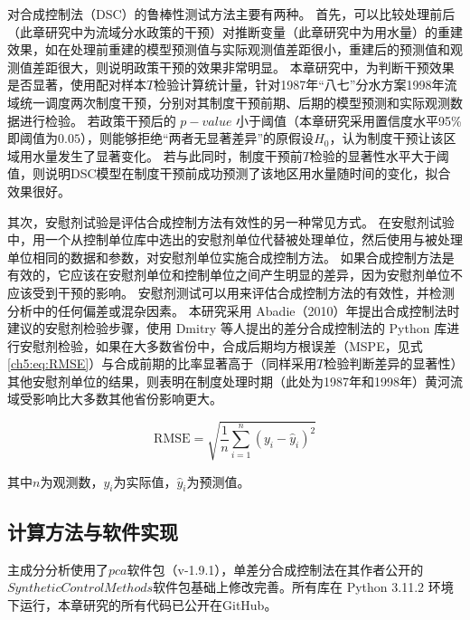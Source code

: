 对合成控制法（DSC）的鲁棒性测试方法主要有两种。
首先，可以比较处理前后（此章研究中为流域分水政策的干预）对推断变量（此章研究中为用水量）的重建效果，如在处理前重建的模型预测值与实际观测值差距很小，重建后的预测值和观测值差距很大，则说明政策干预的效果非常明显。
本章研究中，为判断干预效果是否显著，使用配对样本$T$检验计算统计量，针对1987年“八七”分水方案1998年流域统一调度两次制度干预，分别对其制度干预前期、后期的模型预测和实际观测数据进行检验。
若政策干预后的 $p-value$ 小于阈值（本章研究采用置信度水平95\%即阈值为$0.05$），则能够拒绝“两者无显著差异”的原假设$H_0$，认为制度干预让该区域用水量发生了显著变化。
若与此同时，制度干预前$T$检验的显著性水平大于阈值，则说明DSC模型在制度干预前成功预测了该地区用水量随时间的变化，拟合效果很好。

其次，安慰剂试验是评估合成控制方法有效性的另一种常见方式。
在安慰剂试验中，用一个从控制单位库中选出的安慰剂单位代替被处理单位，然后使用与被处理单位相同的数据和参数，对安慰剂单位实施合成控制方法。
如果合成控制方法是有效的，它应该在安慰剂单位和控制单位之间产生明显的差异，因为安慰剂单位不应该受到干预的影响。
安慰剂测试可以用来评估合成控制方法的有效性，并检测分析中的任何偏差或混杂因素。
本研究采用 Abadie（2010）年提出合成控制法时建议的安慰剂检验步骤\cite{abadie2010}，使用 Dmitry 等人提出的差分合成控制法的 Python 库进行安慰剂检验，如果在大多数省份中，合成后期均方根误差（MSPE，见式\ref{ch5:eq:RMSE}）与合成前期的比率显著高于（同样采用$T$检验判断差异的显著性）其他安慰剂单位的结果，则表明在制度处理时期（此处为1987年和1998年）黄河流域受影响比大多数其他省份影响更大。

\begin{equation}
    \label{ch5:eq:RMSE}
    \text{RMSE} = \sqrt{\frac{1}{n}\sum_{i=1}^{n}{(y_i-\hat{y}_i)}^2} 
\end{equation}

其中$n$为观测数，$y_i$为实际值，$\hat{y}_i$为预测值。

\subsection{计算方法与软件实现}

主成分分析使用了$pca$软件包（v-1.9.1）\cite{Taskesen_pca_A_Python_2020}，单差分合成控制法在其作者公开的$Synthetic Control Methods$软件包基础上修改完善\cite{arkhangelsky2021}。所有库在 Python 3.11.2 环境下运行，本章研究的所有代码已公开在GitHub\cite{song2022c}。
